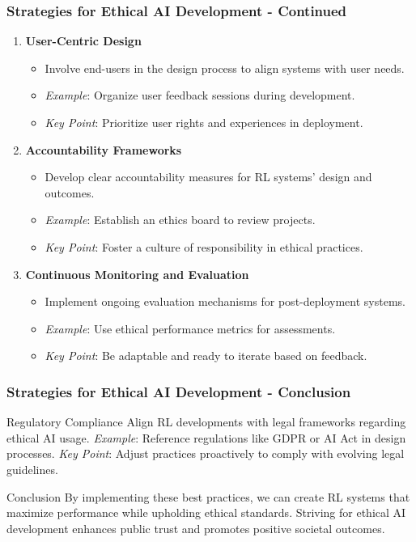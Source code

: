 \documentclass[aspectratio=169]{beamer}
\begin{document}
\begin{frame}[fragile]
    \frametitle{Strategies for Ethical AI Development - Continued}
    \begin{enumerate}[resume]
        \item \textbf{User-Centric Design}
            \begin{itemize}
                \item Involve end-users in the design process to align systems with user needs.
                \item \textit{Example}: Organize user feedback sessions during development.
                \item \textit{Key Point}: Prioritize user rights and experiences in deployment.
            \end{itemize}

        \item \textbf{Accountability Frameworks}
            \begin{itemize}
                \item Develop clear accountability measures for RL systems' design and outcomes.
                \item \textit{Example}: Establish an ethics board to review projects.
                \item \textit{Key Point}: Foster a culture of responsibility in ethical practices.
            \end{itemize}
        
        \item \textbf{Continuous Monitoring and Evaluation}
            \begin{itemize}
                \item Implement ongoing evaluation mechanisms for post-deployment systems.
                \item \textit{Example}: Use ethical performance metrics for assessments.
                \item \textit{Key Point}: Be adaptable and ready to iterate based on feedback.
            \end{itemize}
    \end{enumerate}
\end{frame}

\begin{frame}[fragile]
    \frametitle{Strategies for Ethical AI Development - Conclusion}
    \begin{block}{Regulatory Compliance}
        Align RL developments with legal frameworks regarding ethical AI usage. 
        \textit{Example}: Reference regulations like GDPR or AI Act in design processes. 
        \textit{Key Point}: Adjust practices proactively to comply with evolving legal guidelines.
    \end{block}
    
    \begin{block}{Conclusion}
        By implementing these best practices, we can create RL systems that maximize performance while upholding ethical standards. 
        Striving for ethical AI development enhances public trust and promotes positive societal outcomes.
    \end{block}
\end{frame}
\end{document}
